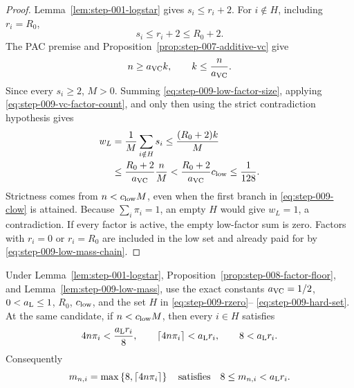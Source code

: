 \begin{proof}
Lemma~\ref{lem:step-001-logstar} gives \(s_i\le r_i+2\).  For
\(i\notin H\), including \(r_i=R_0\),
\begin{equation}\label{eq:step-009-low-factor-size}
s_i\le r_i+2\le R_0+2.
\end{equation}
The PAC premise and Proposition~\ref{prop:step-007-additive-vc} give
\begin{equation}\label{eq:step-009-vc-factor-count}
n\ge a_{\rm VC}k,
\qquad k\le\frac n{a_{\rm VC}}.
\end{equation}
Since every \(s_i\ge2\), \(M>0\).  Summing
\eqref{eq:step-009-low-factor-size}, applying
\eqref{eq:step-009-vc-factor-count}, and only then using the strict
contradiction hypothesis gives
\begin{equation}\label{eq:step-009-low-mass-chain}
\begin{split}
w_L
&=\frac1M\sum_{i\notin H}s_i
\le\frac{(R_0+2)k}{M}\\
&\le\frac{R_0+2}{a_{\rm VC}}\frac nM
<\frac{R_0+2}{a_{\rm VC}}c_{\rm low}
\le\frac1{128}.
\end{split}
\end{equation}
Strictness comes from \(n<c_{\rm low}M\), even when the first branch in
\eqref{eq:step-009-clow} is attained.  Because
\(\sum_i\pi_i=1\), an empty \(H\) would give \(w_L=1\), a contradiction.
If every factor is active, the empty low-factor sum is zero.  Factors with
\(r_i=0\) or \(r_i=R_0\) are included in the low set and already paid for
by \eqref{eq:step-009-low-mass-chain}.
\end{proof}

\begin{lemma}
\label{lem:step-009-active-budget}
Under Lemma~\ref{lem:step-001-logstar},
Proposition~\ref{prop:step-008-factor-floor}, and
Lemma~\ref{lem:step-009-low-mass}, use the exact constants
\(a_{\rm VC}=1/2\), \(0<a_{\rm L}\le1\), \(R_0\), \(c_{\rm low}\), and
the set \(H\) in \eqref{eq:step-009-rzero}--
\eqref{eq:step-009-hard-set}.  At the same candidate, if
\(n<c_{\rm low}M\), then every \(i\in H\) satisfies
\begin{equation}\label{eq:step-009-active-intermediate}
4n\pi_i<\frac{a_{\rm L}r_i}{8},
\qquad
\left\lceil4n\pi_i\right\rceil<a_{\rm L}r_i,
\qquad
8<a_{\rm L}r_i.
\end{equation}
Consequently
\begin{equation}\label{eq:step-009-active-budget}
m_{n,i}=\max\left\{8,\left\lceil4n\pi_i\right\rceil\right\}
\quad\text{satisfies}\quad
8\le m_{n,i}<a_{\rm L}r_i.
\end{equation}
\end{lemma}

